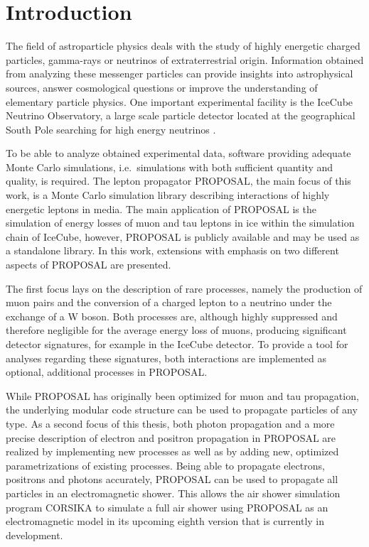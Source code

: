 \chapter{Introduction}

The field of astroparticle physics deals with the study of highly energetic charged particles, gamma-rays or neutrinos of extraterrestrial origin.
Information obtained from analyzing these messenger particles can provide insights into astrophysical sources, answer cosmological questions or improve the understanding of elementary particle physics.
One important experimental facility is the IceCube Neutrino Observatory, a large scale particle detector located at the geographical South Pole searching for high energy neutrinos \cite{Aartsen_2017}.

To be able to analyze obtained experimental data, software providing adequate Monte Carlo simulations, i.e.\ simulations with both sufficient quantity and quality, is required. 
The lepton propagator PROPOSAL, the main focus of this work, is a Monte Carlo simulation library describing interactions of highly energetic leptons in media.
The main application of PROPOSAL is the simulation of energy losses of muon and tau leptons in ice within the simulation chain of IceCube, however, PROPOSAL is publicly available and may be used as a standalone library.
In this work, extensions with emphasis on two different aspects of PROPOSAL are presented.

The first focus lays on the description of rare processes, namely the production of muon pairs and the conversion of a charged lepton to a neutrino under the exchange of a W boson.
Both processes are, although highly suppressed and therefore negligible for the average energy loss of muons, producing significant detector signatures, for example in the IceCube detector.
To provide a tool for analyses regarding these signatures, both interactions are implemented as optional, additional processes in PROPOSAL.

While PROPOSAL has originally been optimized for muon and tau propagation, the underlying modular code structure can be used to propagate particles of any type.
As a second focus of this thesis, both photon propagation and a more precise description of electron and positron propagation in PROPOSAL are realized by implementing new processes as well as by adding new, optimized parametrizations of existing processes.
Being able to propagate electrons, positrons and photons accurately, PROPOSAL can be used to propagate all particles in an electromagnetic shower.
This allows the air shower simulation program CORSIKA to simulate a full air shower using PROPOSAL as an electromagnetic model in its upcoming eighth version that is currently in development.


